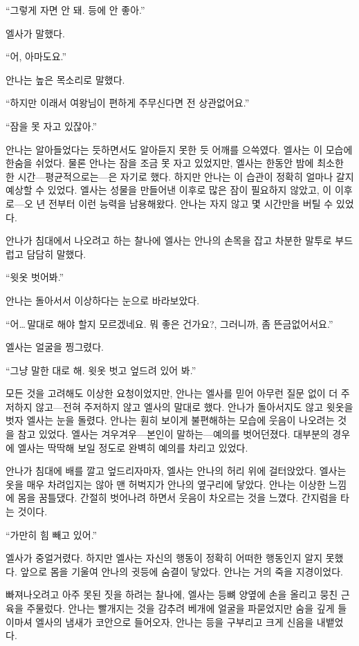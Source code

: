 ``그렇게 자면 안 돼. 등에 안 좋아.''

엘사가 말했다.

``어, 아마도요.''

안나는 높은 목소리로 말했다.

``하지만 이래서 여왕님이 편하게 주무신다면 전 상관없어요.''

``잠을 못 자고 있잖아.''

안나는 알아들었다는 듯하면서도 알아듣지 못한 듯 어깨를 으쓱였다. 엘사는 이 모습에 한숨을 쉬었다. 물론 안나는 잠을 조금 못 자고 있었지만, 엘사는 한동안 밤에 최소한 한 시간—평균적으로는—은 자기로 했다. 하지만 안나는 이 습관이 정확히 얼마나 갈지 예상할 수 있었다. 엘사는 성물을 만들어낸 이후로 많은 잠이 필요하지 않았고, 이 이후로—오 년 전부터 이런 능력을 남용해왔다. 안나는 자지 않고 몇 시간만을 버틸 수 있었다.

안나가 침대에서 나오려고 하는 찰나에 엘사는 안나의 손목을 잡고 차분한 말투로 부드럽고 담담히 말했다.

``윗옷 벗어봐.''

안나는 돌아서서 이상하다는 눈으로 바라보았다.

``어\ldots\,말대로 해야 할지 모르겠네요. 뭐 좋은 건가요?, 그러니까, 좀 뜬금없어서요.''

엘사는 얼굴을 찡그렸다.

``그냥 말한 대로 해. 윗옷 벗고 엎드려 있어 봐.''

모든 것을 고려해도 이상한 요청이었지만, 안나는 엘사를 믿어 아무런 질문 없이 더 주저하지 않고—전혀 주저하지 않고 엘사의 말대로 했다. 안나가 돌아서지도 않고 윗옷을 벗자 엘사는 눈을 돌렸다. 안나는 훤히 보이게 불편해하는 모습에 웃음이 나오려는 것을 참고 있었다. 엘사는 겨우겨우—본인이 말하는—예의를 벗어던졌다. 대부분의 경우에 엘사는 딱딱해 보일 정도로 완벽히 예의를 차리고 있었다.

안나가 침대에 배를 깔고 엎드리자마자, 엘사는 안나의 허리 위에 걸터앉았다. 엘사는 옷을 매우 차려입지는 않아 맨 허벅지가 안나의 옆구리에 닿았다. 안나는 이상한 느낌에 몸을 꿈틀댔다. 간절히 벗어나려 하면서 웃음이 차오르는 것을 느꼈다. 간지럼을 타는 것이다.

``가만히 힘 빼고 있어.''

엘사가 중얼거렸다. 하지만 엘사는 자신의 행동이 정확히 어떠한 행동인지 알지 못했다. 앞으로 몸을 기울여 안나의 귓등에 숨결이 닿았다. 안나는 거의 죽을 지경이었다.

빠져나오려고 아주 못된 짓을 하려는 찰나에, 엘사는 등뼈 양옆에 손을 올리고 뭉친 근육을 주물렀다. 안나는 빨개지는 것을 감추려 베개에 얼굴을 파묻었지만 숨을 깊게 들이마셔 엘사의 냄새가 코안으로 들어오자, 안나는 등을 구부리고 크게 신음을 내뱉었다.

